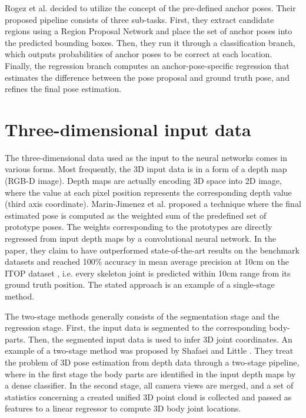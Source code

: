 \vspace{5mm}
\noindent
Rogez et al. \cite{lcrnet} decided to utilize the concept of the pre-defined anchor poses. Their proposed pipeline consists of three sub-tasks. First, they extract candidate regions using a Region Proposal Network \cite{NIPS2015_5638} and place the set of anchor poses into the predicted bounding boxes. Then, they run it through a classification branch, which outputs probabilities of anchor poses to be correct at each location. Finally, the regression branch computes an anchor-pose-specific regression that estimates the difference between the pose proposal and ground truth pose, and refines the final pose estimation. 

\section{Three-dimensional input data}
\noindent The three-dimensional data used as the input to the neural networks comes in various forms. Most frequently, the 3D input data is in a form of a depth map (RGB-D image). Depth maps are actually encoding 3D space into 2D image, where the value at each pixel position represents the corresponding depth value (third axis coordinate). Marin-Jimenez et al. \cite{Marin18jvcir} proposed a technique where the final estimated pose is computed as the weighted sum of the predefined set of prototype poses. The weights corresponding to the prototypes are directly regressed from input depth maps by a convolutional neural network. In the paper, they claim to have outperformed state-of-the-art results on the benchmark datasets and reached 100\% accuracy in mean average precision at 10cm on the ITOP dataset \cite{haque2016viewpoint}, i.e. every skeleton joint is predicted within 10cm range from its ground truth position. The stated approach is an example of a single-stage method.\par
\vspace{5mm}
\noindent The two-stage methods generally consists of the segmentation stage and the regression stage. First, the input data is segmented to the corresponding body-parts. Then, the segmented input data is used to infer 3D joint coordinates. An example of a two-stage method was proposed by Shafaei and Little \cite{Shafaei16}. They treat the problem of 3D pose estimation from depth data through a two-stage pipeline, where in the first stage the body parts are identified in the input depth maps by a dense classifier. In the second stage, all camera views are merged, and a set of statistics concerning a created unified 3D point cloud is collected and passed as features to a linear regressor to compute 3D body joint locations.\par
